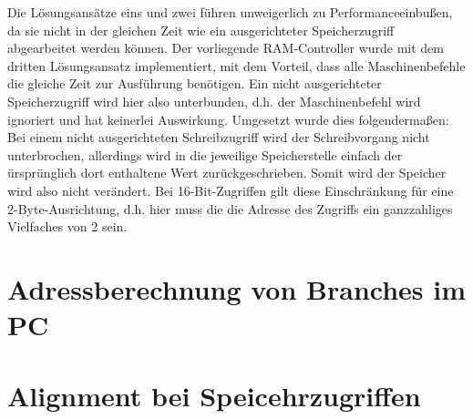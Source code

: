 Die Lösungsansätze eins und zwei führen unweigerlich zu Performanceeinbußen, da sie nicht in der gleichen Zeit wie ein ausgerichteter Speicherzugriff abgearbeitet werden können.
Der vorliegende RAM-Controller wurde mit dem dritten Lösungsansatz implementiert, mit dem Vorteil, dass alle Maschinenbefehle die gleiche Zeit zur Ausführung benötigen.
Ein nicht ausgerichteter Speicherzugriff wird hier also unterbunden, d.h. der Maschinenbefehl wird ignoriert und hat keinerlei Auswirkung.
Umgesetzt wurde dies folgendermaßen:
Bei einem nicht ausgerichteten Schreibzugriff wird der Schreibvorgang nicht unterbrochen, allerdings wird in die jeweilige Speicherstelle einfach der ürsprünglich dort enthaltene Wert zurückgeschrieben.
Somit wird der Speicher wird also nicht verändert.
Bei 16-Bit-Zugriffen gilt diese Einschränkung für eine 2-Byte-Ausrichtung, d.h. hier muss die die Adresse des Zugriffs ein ganzzahliges Vielfaches von 2 sein.
\section{Adressberechnung von Branches im PC}
\section{Alignment bei Speicehrzugriffen}

